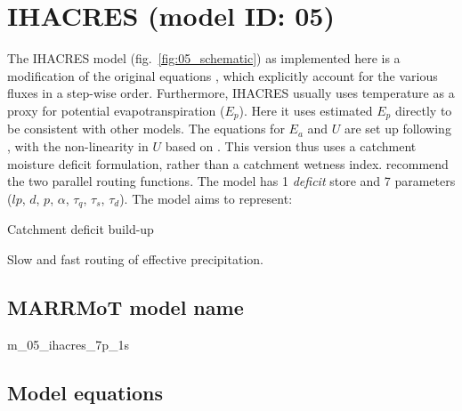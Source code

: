 \section{IHACRES (model ID: 05)}
The IHACRES model (fig.~\ref{fig:05_schematic}) as implemented here is a modification of the original equations \citep{Littlewood1997,Ye1997,Croke2004}, which explicitly account for the various fluxes in a step-wise order. 
Furthermore, IHACRES usually uses temperature as a proxy for potential evapotranspiration ($E_p$). 
Here it  uses estimated $E_p$ directly to be consistent with other models. 
The equations for $E_a$ and $U$ are set up following \citet{Croke2004}, with the non-linearity in $U$ based on \citet{Ye1997}. 
This version thus uses a catchment moisture deficit formulation, rather than a catchment wetness index.
\citet{Littlewood1997} recommend the two parallel routing functions. 
The model has 1 \emph{deficit} store and 7 parameters ($lp$, $d$, $p$, $\alpha$, $\tau_q$, $\tau_s$, $\tau_d$). 
The model aims to represent:

\begin{itemizecompact}
\item Catchment deficit build-up
\item Slow and fast routing of effective precipitation.
\end{itemizecompact}

\subsection{MARRMoT model name}
m\_05\_ihacres\_7p\_1s \\

\subsection{Model equations}

